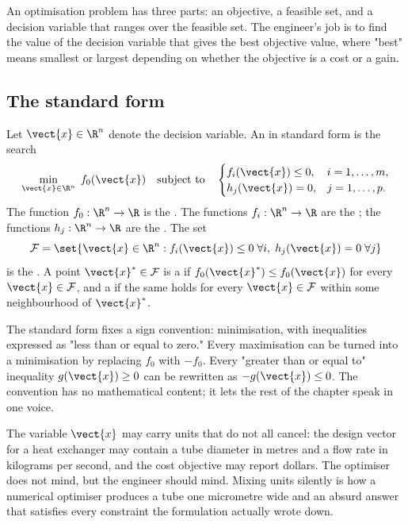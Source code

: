 An optimisation problem has three parts: an objective, a feasible
set, and a decision variable that ranges over the feasible set.
The engineer's job is to find the value of the decision variable
that gives the best objective value, where "best" means smallest
or largest depending on whether the objective is a cost or a
gain.

\subsection{The standard form}

\begin{definition}
Let $\vect{x} \in \R^{n}$ denote the decision variable. An
 in standard form is the search
\[
\min_{\vect{x} \in \R^{n}} \; f_{0}(\vect{x})
\quad \text{subject to} \quad
\begin{cases}
f_{i}(\vect{x}) \leq 0, & i = 1, \ldots, m, \\
h_{j}(\vect{x}) = 0,    & j = 1, \ldots, p.
\end{cases}
\]
The function $f_{0} : \R^{n} \to \R$ is the .
The functions $f_{i} : \R^{n} \to \R$ are the ; the functions $h_{j} : \R^{n} \to \R$ are the
. The set
\[
\mathcal{F} = \set{\vect{x} \in \R^{n} :
f_{i}(\vect{x}) \leq 0 \;\forall i, \;
h_{j}(\vect{x}) = 0 \;\forall j}
\]
is the . A point $\vect{x}^{*} \in
\mathcal{F}$ is a  if $f_{0}(\vect{x}^{*})
\leq f_{0}(\vect{x})$ for every $\vect{x} \in \mathcal{F}$, and a
 if the same holds for every $\vect{x} \in
\mathcal{F}$ within some neighbourhood of $\vect{x}^{*}$.
\end{definition}

The standard form fixes a sign convention: minimisation, with
inequalities expressed as "less than or equal to zero." Every
maximisation can be turned into a minimisation by replacing
$f_{0}$ with $-f_{0}$. Every "greater than or equal to" inequality
$g(\vect{x}) \geq 0$ can be rewritten as $-g(\vect{x}) \leq 0$.
The convention has no mathematical content; it lets the rest of
the chapter speak in one voice.

The variable $\vect{x}$ may carry units that do not all cancel:
the design vector for a heat exchanger may contain a tube
diameter in metres and a flow rate in kilograms per second, and
the cost objective may report dollars. The optimiser does not
mind, but the engineer should mind. Mixing units silently is
how a numerical optimiser produces a tube one micrometre wide
and an absurd answer that satisfies every constraint the
formulation actually wrote down.

